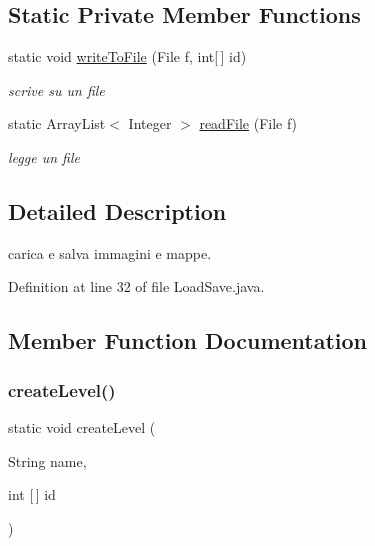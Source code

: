 \subsection*{Static Private Member Functions}
\begin{DoxyCompactItemize}
\item 
static void \hyperlink{classhelpz_1_1_load_save_a953963a355bc62c6a3c1fdb51851d796}{write\+To\+File} (File f, int\mbox{[}$\,$\mbox{]} id)
\begin{DoxyCompactList}\small\item\em scrive su un file \end{DoxyCompactList}\item 
static Array\+List$<$ Integer $>$ \hyperlink{classhelpz_1_1_load_save_a62d3bd4e3f361e1f99bd9d21a7d21b0d}{read\+File} (File f)
\begin{DoxyCompactList}\small\item\em legge un file \end{DoxyCompactList}\end{DoxyCompactItemize}


\subsection{Detailed Description}
carica e salva immagini e mappe. 

Definition at line 32 of file Load\+Save.\+java.



\subsection{Member Function Documentation}
\mbox{\label{classhelpz_1_1_load_save_a934717f63182b47ab05a70ec40cef235}} 
\subsubsection{\texorpdfstring{create\+Level()}{createLevel()}}
{\footnotesize\ttfamily static void create\+Level (\begin{DoxyParamCaption}\item[{String}]{name,  }\item[{int \mbox{[}$\,$\mbox{]}}]{id }\end{DoxyParamCaption})\hspace{0.3cm}{\ttfamily [static]}}



